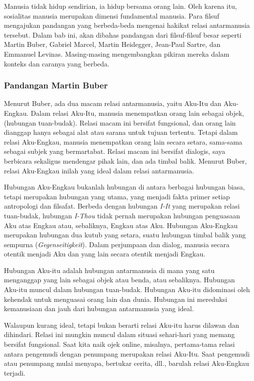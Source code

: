 \documentclass[10pt,a4paper]{article}
\begin{document}
\begin{multicols}{2}
Manusia tidak hidup sendirian, ia hidup bersama orang lain. Oleh karena
itu, sosialitas manusia merupakan dimensi fundamental manusia. Para
filsuf mengajukan pandangan yang berbeda-beda mengenai hakikat relasi
antarmanusia tersebut. Dalam bab ini, akan dibahas pandangan dari
filsuf-filsuf besar seperti Martin Buber, Gabriel Marcel, Martin
Heidegger, Jean-Paul Sartre, dan Emmanuel Levinas. Masing-masing
mengembangkan pikiran mereka dalam konteks dan caranya yang berbeda.

\hypertarget{pandangan-martin-buber}{%
\subsubsection{Pandangan Martin Buber}\label{pandangan-martin-buber}}

Menurut Buber, ada dua macam relasi antarmanusia, yaitu Aku-Itu dan
Aku-Engkau. Dalam relasi Aku-Itu, manusia menempatkan orang lain sebagai
objek, (hubungan tuan-budak). Relasi macam ini bersifat fungsional, dan
orang lain dianggap hanya sebagai alat atau sarana untuk tujuan
tertentu. Tetapi dalam relasi Aku-Engkau, manusia menempatkan orang lain
secara setara, sama-sama sebagai subjek yang bermartabat. Relasi macam
ini bersifat dialogis, saya berbicara sekaligus mendengar pihak lain,
dan ada timbal balik. Menurut Buber, relasi Aku-Engkau inilah yang ideal
dalam relasi antarmanusia.

Hubungan Aku-Engkau bukanlah hubungan di antara berbagai hubungan biasa,
tetapi merupakan hubungan yang utama, yang menjadi fakta primer setiap
antropologi dan filsafat. Berbeda dengan hubungan \emph{I-It} yang
merupakan relasi tuan-budak, hubungan \emph{I-Thou} tidak pernah
merupakan hubungan penguasaan Aku atas Engkau atau, sebaliknya, Engkau
atas Aku. Hubungan Aku-Engkau merupakan hubungan dua kutub yang setara,
suatu hubungan timbal balik yang sempurna (\emph{Gegenseitigkeit}).
Dalam perjumpaan dan dialog, manusia secara otentik menjadi Aku dan yang
lain secara otentik menjadi Engkau.

Hubungan Aku-itu adalah hubungan antarmanusia di mana yang satu
menganggap yang lain sebagai objek atau benda, atau sebaliknya. Hubungan
Aku-itu muncul dalam hubungan tuan-budak. Hubungan Aku-itu didominasi
oleh kehendak untuk menguasai orang lain dan dunia. Hubungan ini
mereduksi kemanusiaan dan jauh dari hubungan antarmanusia yang ideal.

Walaupun kurang ideal, tetapi bukan berarti relasi Aku-itu harus dilawan
dan dihindari. Relasi ini mungkin muncul dalam situasi sehari-hari yang
memang bersifat fungsional. Saat kita naik ojek online, misalnya,
pertama-tama relasi antara pengemudi dengan penumpang merupakan relasi
Aku-Itu. Saat pengemudi atau penumpang mulai menyapa, bertukar cerita,
dll., barulah relasi Aku-Engkau terjadi.


\end{multicols}
\end{document}

